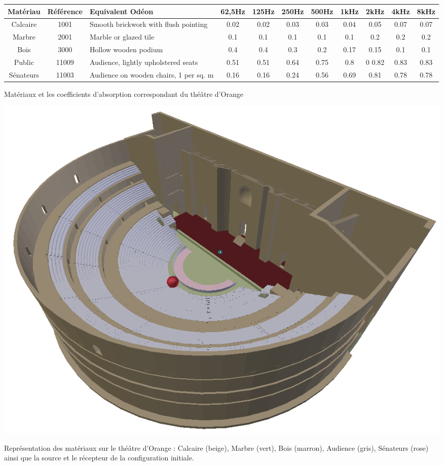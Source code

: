 %
\begin{tableth} 
\footnotesize
	\begin{tabular}{| c | c | m{2cm} | *{8}{c|}}
		\hline
		Matériau &Référence & Equivalent Odéon & 62,5Hz & 125Hz & 250Hz & 500Hz & 1kHz & 2kHz & 4kHz & 8kHz \\
		  \hline
		  \hline
		   Calcaire & 1001 & Smooth brickwork with flush pointing\footnotemark & 0.02&	0.02&	0.03&	0.03&	0.04&	0.05&	0.07&	0.07 \\
		   \hline
		Marbre &2001 & Marble or glazed tile\footnotemark & 0.1 & 0.1 & 0.1 & 0.1 & 0.1 & 0.2 & 0.2 & 0.2 \\
		   \hline
		Bois & 3000 & Hollow wooden podium\footnotemark & 0.4&0.4&0.3&	0.2&	0.17& 0.15& 0.1&	0.1 \\
		   \hline
		Public & 11009 & Audience, lightly upholstered seats\footnotemark & 0.51&	0.51&	0.64&	0.75&	0.8&0	0.82&	0.83&	0.83 \\
	     \hline
	     		Sénateurs & 11003 & Audience on wooden chairs, 1 per sq. m\footnotemark & 0.16 & 0.16 & 0.24 & 0.56 & 0.69 & 0.81 & 0.78 & 0.78 \\
	     \hline

	 \end{tabular}
	\caption{Matériaux et les coefficients d'absorption correspondant du théâtre d'Orange}
	\label{matOdeon}
\end{tableth}
\addtocounter{footnote}{-1}
\addtocounter{footnote}{-1}
\addtocounter{footnote}{-1}
\addtocounter{footnote}{1}
\addtocounter{footnote}{1}

\begin{figureth}
	\includegraphics[width=0.9\linewidth]{images/theatreMat}
	\caption{Représentation des matériaux sur le théâtre d'Orange : Calcaire (beige), Marbre (vert), Bois (marron), Audience (gris), Sénateurs (rose) ainsi que la source et le récepteur de la configuration initiale.}
	\label{theatreMat}
\end{figureth}

